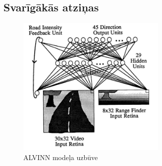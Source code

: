 \documentclass[12pt, a4paper]{article}
\numberwithin{equation}{section} %
\begin{document}
\subsection{Svarīgākās atziņas}

\begin{figure}[t!]
    \centering
    \includegraphics[height=6.8cm,page=1]{../img/alvinn_architecture.png}
    \caption{ALVINN modeļa uzbūve}
\end{figure}

\newpage
{}
\printbibliography[title=Atsauces]
\end{document}
